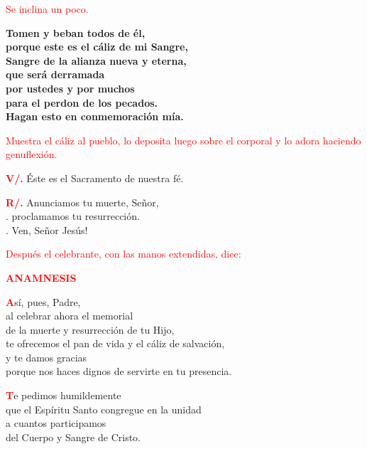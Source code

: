 \documentclass[12pt, letterpaper, spanish]{article}
\begin{document}
  \large{\textcolor{red}{Se inclina un poco.}}

  \noindent
  \LARGE{ \bfseries{ Tomen y beban todos de \'el,\\
  porque este es el c\'aliz de mi Sangre,\\
  Sangre de la alianza nueva y eterna,\\
  que ser\'a derramada\\
  por ustedes y por muchos\\
  para el perdon de los pecados.\\
  Hagan esto en conmemoraci\'on m\'ia.}}

  \large{\textcolor{red}{Muestra el c\'aliz al pueblo, lo deposita luego sobre el corporal y lo adora haciendo genuflexi\'on.}}

  \clearpage

  \noindent
  \Large {\bfseries \textcolor{red}{V/.}} \hspace{0.5cm} \'Este es el Sacramento de nuestra f\'e.

  \noindent
  \Large {\bfseries \textcolor{red}{R/.}} \hspace{0.5cm} Anunciamos tu muerte, Se\~nor,\\
  . \hspace{1.5cm} proclamamos tu resurrecci\'on.\\
  . \hspace{1.5cm} Ven, Se\~nor Jes\'us!
  
  \large{\textcolor{red}{Despu\'es el celebrante, con las manos extendidas, dice:}} 

  \Large {\bfseries \textcolor{red}{ANAMNESIS}}

  \lettrine[lines=2]{\bfseries \textcolor{red}{A}}{}\Large s\'i, pues, Padre,\\
  al celebrar ahora el memorial\\
  de la muerte y resurrecci\'on de tu Hijo,\\
  te ofrecemos el pan de vida y el c\'aliz de salvaci\'on,\\
  y te damos gracias\\
  porque nos haces dignos de servirte en tu presencia.

  \lettrine[lines=2]{\bfseries \textcolor{red}{T}}{}\Large e pedimos humildemente\\
  que el Esp\'iritu Santo congregue en la unidad\\
  a cuantos participamos\\
  del Cuerpo y Sangre de Cristo.
\end{document}
